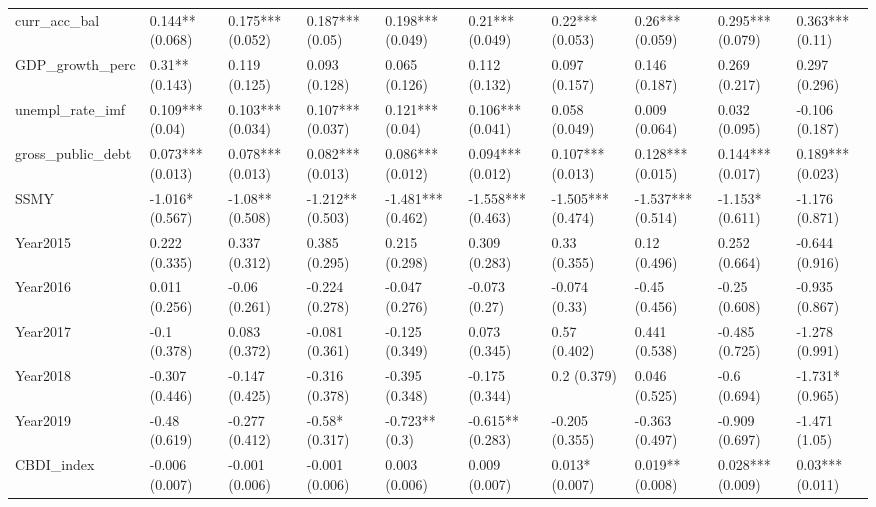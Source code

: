 \begin{table}[ht]
\begin{tabular}{llllllllll}
  curr\_acc\_bal & 0.144** (0.068) & 0.175*** (0.052) & 0.187*** (0.05) & 0.198*** (0.049) & 0.21*** (0.049) & 0.22*** (0.053) & 0.26*** (0.059) & 0.295*** (0.079) & 0.363*** (0.11) \\ 
  GDP\_growth\_perc & 0.31** (0.143) & 0.119 (0.125) & 0.093 (0.128) & 0.065 (0.126) & 0.112 (0.132) & 0.097 (0.157) & 0.146 (0.187) & 0.269 (0.217) & 0.297 (0.296) \\ 
  unempl\_rate\_imf & 0.109*** (0.04) & 0.103*** (0.034) & 0.107*** (0.037) & 0.121*** (0.04) & 0.106*** (0.041) & 0.058 (0.049) & 0.009 (0.064) & 0.032 (0.095) & -0.106 (0.187) \\ 
  gross\_public\_debt & 0.073*** (0.013) & 0.078*** (0.013) & 0.082*** (0.013) & 0.086*** (0.012) & 0.094*** (0.012) & 0.107*** (0.013) & 0.128*** (0.015) & 0.144*** (0.017) & 0.189*** (0.023) \\ 
  SSMY & -1.016* (0.567) & -1.08** (0.508) & -1.212** (0.503) & -1.481*** (0.462) & -1.558*** (0.463) & -1.505*** (0.474) & -1.537*** (0.514) & -1.153* (0.611) & -1.176 (0.871) \\ 
  Year2015 & 0.222 (0.335) & 0.337 (0.312) & 0.385 (0.295) & 0.215 (0.298) & 0.309 (0.283) & 0.33 (0.355) & 0.12 (0.496) & 0.252 (0.664) & -0.644 (0.916) \\ 
  Year2016 & 0.011 (0.256) & -0.06 (0.261) & -0.224 (0.278) & -0.047 (0.276) & -0.073 (0.27) & -0.074 (0.33) & -0.45 (0.456) & -0.25 (0.608) & -0.935 (0.867) \\ 
  Year2017 & -0.1 (0.378) & 0.083 (0.372) & -0.081 (0.361) & -0.125 (0.349) & 0.073 (0.345) & 0.57 (0.402) & 0.441 (0.538) & -0.485 (0.725) & -1.278 (0.991) \\ 
  Year2018 & -0.307 (0.446) & -0.147 (0.425) & -0.316 (0.378) & -0.395 (0.348) & -0.175 (0.344) & 0.2 (0.379) & 0.046 (0.525) & -0.6 (0.694) & -1.731* (0.965) \\ 
  Year2019 & -0.48 (0.619) & -0.277 (0.412) & -0.58* (0.317) & -0.723** (0.3) & -0.615** (0.283) & -0.205 (0.355) & -0.363 (0.497) & -0.909 (0.697) & -1.471 (1.05) \\ 
  CBDI\_index & -0.006 (0.007) & -0.001 (0.006) & -0.001 (0.006) & 0.003 (0.006) & 0.009 (0.007) & 0.013* (0.007) & 0.019** (0.008) & 0.028*** (0.009) & 0.03*** (0.011) \\ 
   \bottomrule
\end{tabular}
\endgroup
\end{table}
